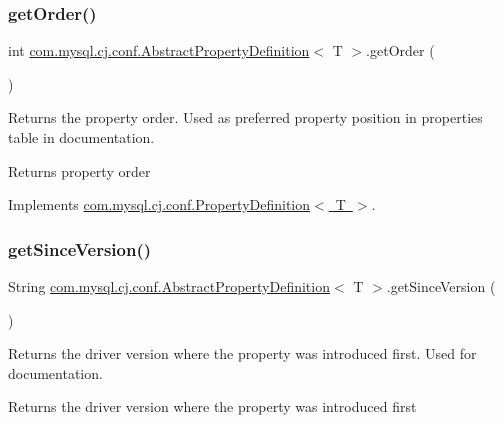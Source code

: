 \subsubsection{\texorpdfstring{get\+Order()}{getOrder()}}
{\footnotesize\ttfamily int \mbox{\hyperlink{classcom_1_1mysql_1_1cj_1_1conf_1_1_abstract_property_definition}{com.\+mysql.\+cj.\+conf.\+Abstract\+Property\+Definition}}$<$ T $>$.get\+Order (\begin{DoxyParamCaption}{ }\end{DoxyParamCaption})}

Returns the property order. Used as preferred property position in properties table in documentation.

\begin{DoxyReturn}{Returns}
property order 
\end{DoxyReturn}


Implements \mbox{\hyperlink{interfacecom_1_1mysql_1_1cj_1_1conf_1_1_property_definition_a4e40dac46393e75d5b57db4024a5ecf4}{com.\+mysql.\+cj.\+conf.\+Property\+Definition$<$ T $>$}}.

\mbox{\label{classcom_1_1mysql_1_1cj_1_1conf_1_1_abstract_property_definition_a7f8ad00dc040a63ca6ec46ebda863a1d}} 
\subsubsection{\texorpdfstring{get\+Since\+Version()}{getSinceVersion()}}
{\footnotesize\ttfamily String \mbox{\hyperlink{classcom_1_1mysql_1_1cj_1_1conf_1_1_abstract_property_definition}{com.\+mysql.\+cj.\+conf.\+Abstract\+Property\+Definition}}$<$ T $>$.get\+Since\+Version (\begin{DoxyParamCaption}{ }\end{DoxyParamCaption})}

Returns the driver version where the property was introduced first. Used for documentation.

\begin{DoxyReturn}{Returns}
the driver version where the property was introduced first 
\end{DoxyReturn}



